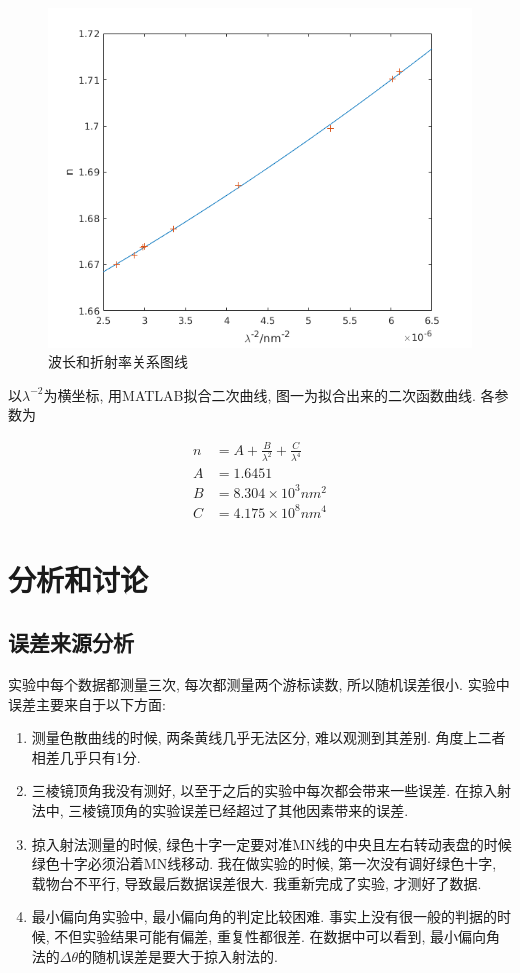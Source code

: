 \documentclass[a4paper,12pt,notitlepage]{article}
\begin{document}
\begin{figure}
\centering
	\includegraphics[scale=0.7]{figure.png}
	\caption{波长和折射率关系图线}
\end{figure}

	以$\lambda^{-2}$为横坐标, 用MATLAB拟合二次曲线, 图一为拟合出来的二次函数曲线. 各参数为
	
\begin{align*}
	n &= A + \frac{B}{\lambda^2} + \frac{C}{\lambda^4} \\
	A &= 1.6451 \\
	B &= 8.304 \times 10^3 nm^2 \\
	C &= 4.175 \times 10^8 nm^4
\end{align*}

\section{分析和讨论}

\subsection{误差来源分析}

	实验中每个数据都测量三次, 每次都测量两个游标读数, 所以随机误差很小. 实验中误差主要来自于以下方面:
	
\begin{enumerate}
	\item 测量色散曲线的时候, 两条黄线几乎无法区分, 难以观测到其差别. 角度上二者相差几乎只有1分. 
	\item 三棱镜顶角我没有测好, 以至于之后的实验中每次都会带来一些误差. 在掠入射法中, 三棱镜顶角的实验误差已经超过了其他因素带来的误差.
	\item 掠入射法测量的时候, 绿色十字一定要对准MN线的中央且左右转动表盘的时候绿色十字必须沿着MN线移动. 我在做实验的时候, 第一次没有调好绿色十字, 载物台不平行, 导致最后数据误差很大. 我重新完成了实验, 才测好了数据.
	\item 最小偏向角实验中, 最小偏向角的判定比较困难. 事实上没有很一般的判据的时候, 不但实验结果可能有偏差, 重复性都很差. 在数据中可以看到, 最小偏向角法的$\Delta \theta$的随机误差是要大于掠入射法的. 
\end{enumerate}
\end{document}
